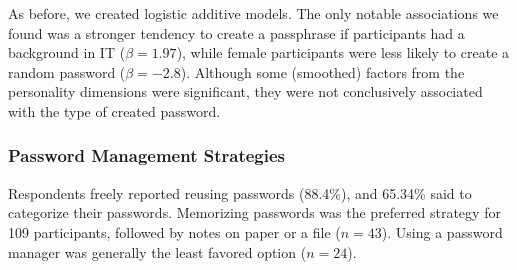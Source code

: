 As before, we created logistic additive models. The only notable associations we found was a stronger tendency to create a passphrase if participants had a background in IT ($\beta=1.97$), while female participants were less likely to create a random password ($\beta =-2.8$). Although some (smoothed) factors from the personality dimensions were significant, they were not conclusively associated with the type of created password.

\subsubsection{Password Management Strategies}
Respondents freely reported reusing passwords (88.4\%), and 65.34\% said to categorize their passwords. Memorizing passwords was the preferred strategy for 109 participants, followed by notes on paper or a file ($n=43$). Using a password manager was generally the least favored option ($n=24$).

